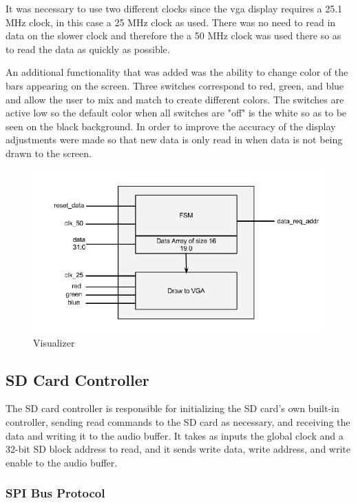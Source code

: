 \documentclass{article}
\begin{document}
It was necessary to use two different clocks since the vga display requires a 25.1 MHz clock, in this case a 25 MHz clock as used.  There was no need to read in data on the slower clock and therefore the a 50 MHz clock was used there so as to read the data as quickly as possible. 

An additional functionality that was added was the ability to change color of the bars appearing on the screen.  
Three switches correspond to red, green, and blue and allow the user to mix 
and match to create different colors.  The switches are active low so the 
default color when all switches are "off" is the white so as to be seen on the 
black background.  In order to improve the accuracy of the display adjustments 
were made so that new data is only read in when data is not being drawn to the screen.

\begin{figure}[H]
	\centering
	\includegraphics[scale=0.5]{viz_block_diagram.png}
	\caption{Visualizer}
\end{figure}

\subsection{SD Card Controller}

The SD card controller is responsible for initializing the SD card's own
built-in controller, sending read commands to the SD card as necessary, and
receiving the data and writing it to the audio buffer.  It takes as inputs the
global clock and a 32-bit SD block address to read, and it sends write data,
write address, and write enable to the audio buffer.

\subsubsection{SPI Bus Protocol}
\end{document}
